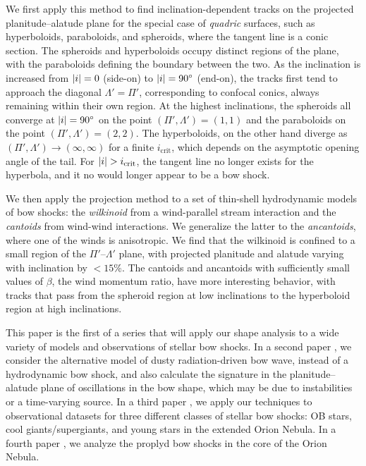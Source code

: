 We first apply this method to find inclination-dependent tracks
on the projected planitude--alatude plane for the special case of
\textit{quadric} surfaces, such as hyperboloids, paraboloids, and
spheroids, where the tangent line is a conic section.  The spheroids
and hyperboloids occupy distinct regions of the plane, with the
paraboloids defining the boundary between the two.  As the inclination
is increased from \(\lvert i\rvert = 0\) (side-on) to \(\lvert i\rvert = 90^\circ\)
(end-on), the tracks first tend to approach the diagonal
\(\Lambda' = \Pi'\), corresponding to confocal conics, always remaining within
their own region.  At the highest inclinations, the spheroids all
converge at \(\lvert i\rvert = 90^\circ\) on the point
\((\Pi', \Lambda') = (1, 1)\) and the paraboloids on the point
\((\Pi', \Lambda') = (2, 2)\).  The hyperboloids, on the other hand diverge as
\((\Pi', \Lambda') \to (\infty, \infty)\) for a finite
\(i_{\mathrm{crit}}\), which depends on the asymptotic opening angle
of the tail.  For \(\lvert i\rvert > i_{\mathrm{crit}}\), the tangent line no
longer exists for the hyperbola, and it no would longer appear to be a
bow shock.

We then apply the projection method to a set of thin-shell
hydrodynamic models of bow shocks: the \textit{wilkinoid} from a
wind-parallel stream interaction and the \textit{cantoids} from
wind-wind interactions.  We generalize the latter to the
\textit{ancantoids}, where one of the winds is anisotropic.  We find
that the wilkinoid is confined to a small region of the
\(\Pi'\)--\(\Lambda'\) plane, with projected planitude and alatude varying with
inclination by \(< 15\%\).  The cantoids and ancantoids with
sufficiently small values of \(\beta\), the wind momentum ratio, have more
interesting behavior, with tracks that pass from the spheroid region
at low inclinations to the hyperboloid region at high inclinations.  

This paper is the first of a series that will apply our shape analysis
to a wide variety of models and observations of stellar bow shocks.
In a second paper \citep{Henney:2018a}, we consider the alternative
model of dusty radiation-driven bow wave, instead of a hydrodynamic
bow shock, and also calculate the signature in the planitude--alatude
plane of oscillations in the bow shape, which may be due to
instabilities or a time-varying source.  In a third paper
\citep{Henney:2018b}, we apply our techniques to observational
datasets for three different classes of stellar bow shocks: OB stars,
cool giants/supergiants, and young stars in the extended Orion Nebula.
In a fourth paper \citep{Tarango-Yong:2018b}, we analyze the proplyd
bow shocks in the core of the Orion Nebula.


